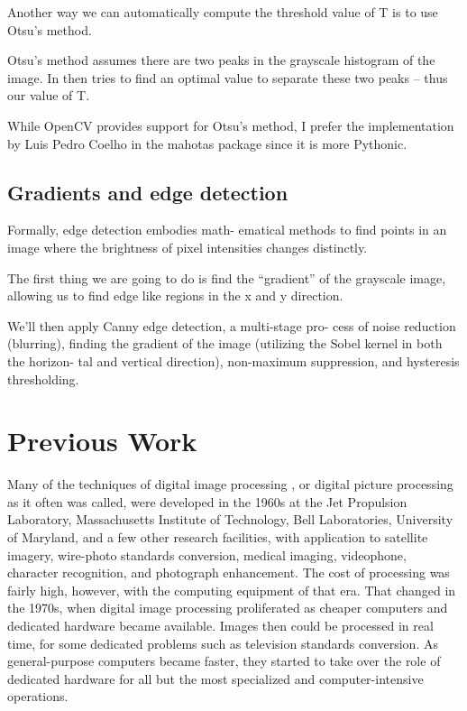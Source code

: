 \documentclass[BTech]{srmuthesis}
\begin{document}
Another way we can automatically compute the threshold value of T is to use Otsu’s method.

Otsu’s method assumes there are two peaks in the grayscale histogram of the image. In then tries to find an optimal value to separate these two peaks – thus our value of T.

While OpenCV provides support for Otsu’s method, I prefer the implementation by Luis Pedro Coelho in the mahotas package since it is more Pythonic.


\subsection{Gradients and edge detection}

Formally, edge detection embodies math- ematical methods to find points in an image where the brightness of pixel intensities changes distinctly.

The first thing we are going to do is find the “gradient” of the grayscale image, allowing us to find edge like regions in the x and y direction.

We’ll then apply Canny edge detection, a multi-stage pro- cess of noise reduction (blurring), finding the gradient of the image (utilizing the Sobel kernel in both the horizon- tal and vertical direction), non-maximum suppression, and hysteresis thresholding.


\section{Previous Work}

Many of the techniques of digital image processing \cite{wiki_digital_image_processing}, or digital picture processing as it often was called, were developed in the 1960s at the Jet Propulsion Laboratory, Massachusetts Institute of Technology, Bell Laboratories, University of Maryland, and a few other research facilities, with application to satellite imagery, wire-photo standards conversion, medical imaging, videophone, character recognition, and photograph enhancement. The cost of processing was fairly high, however, with the computing equipment of that era. That changed in the 1970s, when digital image processing proliferated as cheaper computers and dedicated hardware became available. Images then could be processed in real time, for some dedicated problems such as television standards conversion. As general-purpose computers became faster, they started to take over the role of dedicated hardware for all but the most specialized and computer-intensive operations.
\end{document}
